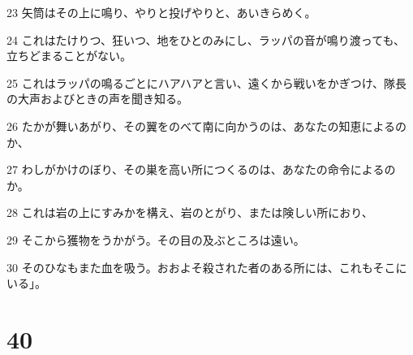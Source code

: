 \par 23 矢筒はその上に鳴り、やりと投げやりと、あいきらめく。
\par 24 これはたけりつ、狂いつ、地をひとのみにし、ラッパの音が鳴り渡っても、立ちどまることがない。
\par 25 これはラッパの鳴るごとにハアハアと言い、遠くから戦いをかぎつけ、隊長の大声およびときの声を聞き知る。
\par 26 たかが舞いあがり、その翼をのべて南に向かうのは、あなたの知恵によるのか、
\par 27 わしがかけのぼり、その巣を高い所につくるのは、あなたの命令によるのか。
\par 28 これは岩の上にすみかを構え、岩のとがり、または険しい所におり、
\par 29 そこから獲物をうかがう。その目の及ぶところは遠い。
\par 30 そのひなもまた血を吸う。おおよそ殺された者のある所には、これもそこにいる」。

\chapter{40}

